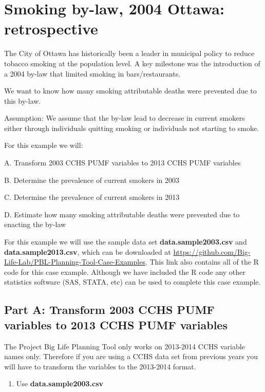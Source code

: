 \documentclass[]{book}
\providecommand{\tightlist}{%
  \setlength{\itemsep}{0pt}\setlength{\parskip}{0pt}}
\begin{document}
\section{Smoking by-law, 2004 Ottawa:
retrospective}\label{smoking-by-law-2004-ottawa-retrospective}

The City of Ottawa has historically been a leader in municipal policy to
reduce tobacco smoking at the population level. A key milestone was the
introduction of a 2004 by-law that limited smoking in bars/restaurants.

We want to know how many smoking attributable deaths were prevented due
to this by-law.

Assumption: We assume that the by-law lead to decrease in current
smokers either through individuals quitting smoking or individuals not
starting to smoke.

For this example we will:

A. Transform 2003 CCHS PUMF variables to 2013 CCHS PUMF variables

B. Determine the prevalence of current smokers in 2003

C. Determine the prevalence of current smokers in 2013

D. Estimate how many smoking attributable deaths were prevented due to
enacting the by-law

For this example we will use the sample data set
\textbf{data.sample2003.csv} and \textbf{data.sample2013.csv}, which can
be downloaded at
\url{https://github.com/Big-Life-Lab/PBL-Planning-Tool-Case-Examples}.
This link also contains all of the R code for this case example.
Although we have included the R code any other statistics software (SAS,
STATA, etc) can be used to complete this case example.

\subsection{Part A: Transform 2003 CCHS PUMF variables to 2013 CCHS PUMF
variables}\label{part-a-transform-2003-cchs-pumf-variables-to-2013-cchs-pumf-variables}

The Project Big Life Planning Tool only works on 2013-2014 CCHS variable
names only. Therefore if you are using a CCHS data set from previous
years you will have to transform the variables to the 2013-2014 format.

\begin{enumerate}
\def\labelenumi{\arabic{enumi}.}
\tightlist
\item
  Use \textbf{data.sample2003.csv}
\end{enumerate}
\end{document}
